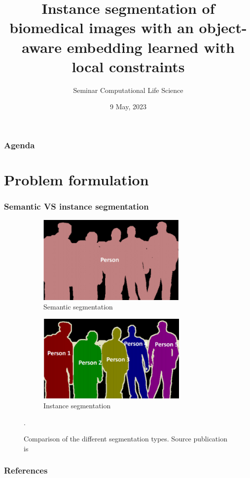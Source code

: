 \documentclass{beamer}
\title[Instance segmentation]{Instance segmentation of biomedical images with an object-aware
embedding learned with local constraints}
\subtitle{Seminar Computational Life Science}
\author[Oleh Shkalikov]{\aut{Oleh Shkalikov}{5102818}}
\institute[TU Dresden]{TU Dresden, Computer Science Faculty}
\date{9 May, 2023}
\begin{document}
\frame{\titlepage}

\begin{frame}
    \frametitle{Agenda}
    \tableofcontents
\end{frame}

\section{Problem formulation}

\begin{frame}
    \frametitle{Semantic VS instance segmentation}

    \begin{figure}[h]
        \begin{subfigure}{0.49\textwidth}
            \centering
            \includegraphics[width=0.8\textwidth]{semantic_segm_example.png}
            \caption{Semantic segmentation}
        \end{subfigure}
        \begin{subfigure}{0.49\textwidth}
            \centering
            \includegraphics[width=0.8\textwidth]{instance_segm_example.png}
            \caption{Instance segmentation}
        \end{subfigure}
        \caption{Comparison of the different segmentation types. Source publication is \cite{segm_type_comp}}.
    \end{figure}

\end{frame}

\begin{frame}[allowframebreaks]
    \frametitle{References}

    
    
\end{frame}
\end{document}
